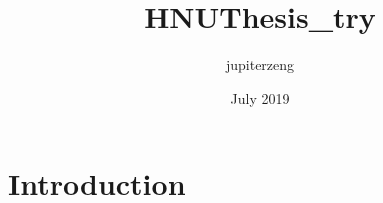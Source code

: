 \documentclass{article}
\title{HNUThesis_try}
\author{jupiterzeng }
\date{July 2019}
\begin{document}
\maketitle

\section{Introduction}
\end{document}
